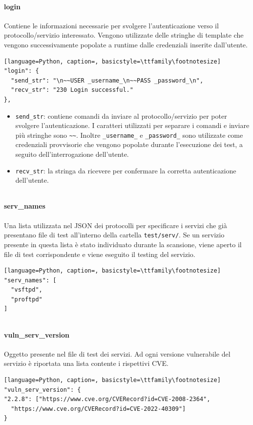 \documentclass[12pt]{report}
\begin{document}
\noindent
\\
\textbf{login}
\\\\
Contiene le informazioni necessarie per svolgere l'autenticazione verso il protocollo/servizio interessato. Vengono utilizzate delle stringhe di template che vengono successivamente popolate a runtime dalle credenziali inserite dall'utente.
\begin{lstlisting}[language=Python, caption=, basicstyle=\ttfamily\footnotesize]
"login": {
  "send_str": "\n~~USER _username_\n~~PASS _password_\n",
  "recv_str": "230 Login successful."
},
\end{lstlisting}
\begin{itemize}
    \item \lstinline{send_str}: contiene comandi da inviare al protocollo/servizio per poter svolgere l'autenticazione. I caratteri utilizzati per separare i comandi e inviare più stringhe sono \lstinline{~~}. Inoltre \lstinline{_username_} e \lstinline{_password_} sono utilizzate come credenziali provvisorie che vengono popolate durante l'esecuzione dei test, a seguito dell'interrogazione dell'utente.  
    \item \lstinline{recv_str}: la stringa da ricevere per confermare la corretta autenticazione dell'utente.
\end{itemize}

\noindent
\\
\textbf{serv\_names}
\\\\
Una lista utilizzata nel JSON dei protocolli per specificare i servizi che già presentano file di test all'interno della cartella \lstinline{test/serv/}. Se un servizio presente in questa lista è stato individuato durante la scansione, viene aperto il file di test corrispondente e viene eseguito il testing del servizio.
\begin{lstlisting}[language=Python, caption=, basicstyle=\ttfamily\footnotesize]
"serv_names": [
  "vsftpd",
  "proftpd"
]
\end{lstlisting}

\noindent
\\
\textbf{vuln\_serv\_version}
\\\\
Oggetto presente nel file di test dei servizi. Ad ogni versione vulnerabile del servizio è riportata una lista contente i rispettivi CVE.
\begin{lstlisting}[language=Python, caption=, basicstyle=\ttfamily\footnotesize]
"vuln_serv_version": {
"2.2.8": ["https://www.cve.org/CVERecord?id=CVE-2008-2364", 
  "https://www.cve.org/CVERecord?id=CVE-2022-40309"]
}
\end{lstlisting}
\end{document}
